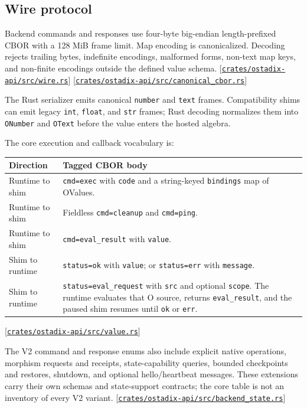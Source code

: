 \documentclass[11pt,oneside]{article}
\newcommand{\src}[1]{\textcolor{OSlate}{\scriptsize[\href{https://github.com/lostadi/OSTADIX/blob/c0b02c326b2329a95ba52447c7180bc93957cd57/#1}{\nolinkurl{#1}}]}\allowbreak}
\begin{document}
\subsection{Wire protocol}

Backend commands and responses use four-byte big-endian length-prefixed CBOR
with a 128 MiB frame limit. Map encoding is canonicalized. Decoding rejects
trailing bytes, indefinite encodings, malformed forms, non-text map keys, and
non-finite encodings outside the defined value schema.
\src{crates/ostadix-api/src/wire.rs}
\src{crates/ostadix-api/src/canonical_cbor.rs}

The Rust serializer emits canonical \texttt{number} and \texttt{text} frames.
Compatibility shims can emit legacy \texttt{int}, \texttt{float}, and
\texttt{str} frames; Rust decoding normalizes them into \texttt{ONumber} and
\texttt{OText} before the value enters the hosted algebra.

The core execution and callback vocabulary is:

\begin{longtable}{P{0.24\textwidth} P{0.68\textwidth}}
\toprule
\textbf{Direction} & \textbf{Tagged CBOR body} \\
\midrule
\endhead
Runtime to shim & \texttt{cmd=exec} with \texttt{code} and a string-keyed
\texttt{bindings} map of OValues. \\
Runtime to shim & Fieldless \texttt{cmd=cleanup} and \texttt{cmd=ping}. \\
Runtime to shim & \texttt{cmd=eval\_result} with \texttt{value}. \\
Shim to runtime & \texttt{status=ok} with \texttt{value}; or
\texttt{status=err} with \texttt{message}. \\
Shim to runtime & \texttt{status=eval\_request} with \texttt{src} and optional
\texttt{scope}. The runtime evaluates that O source, returns
\texttt{eval\_result}, and the paused shim resumes until \texttt{ok} or
\texttt{err}. \\
\bottomrule
\end{longtable}
\src{crates/ostadix-api/src/value.rs}

The V2 command and response enums also include explicit native operations,
morphism requests and receipts, state-capability queries, bounded checkpoints
and restores, shutdown, and optional hello/heartbeat messages. These extensions
carry their own schemas and state-support contracts; the core table is not
an inventory of every V2 variant.
\src{crates/ostadix-api/src/backend_state.rs}
\end{document}

